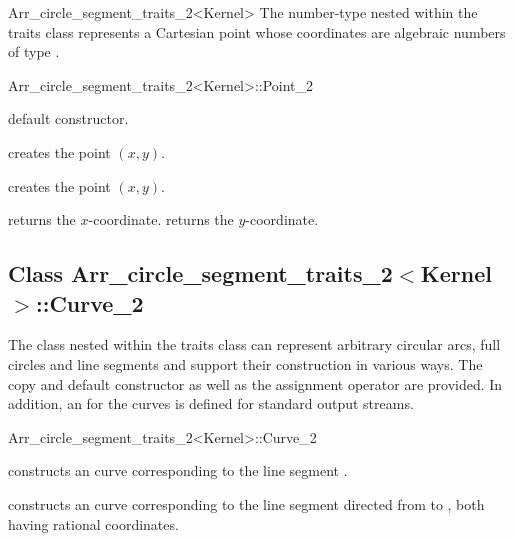 \begin{ccRefClass}{Arr_circle_segment_traits_2<Kernel>}
The  number-type nested within the traits class represents
a Cartesian point whose coordinates are algebraic numbers of type
.

\begin{ccClass}{Arr_circle_segment_traits_2<Kernel>::Point_2}

\ccTypes



\ccCreation
{}

    {default constructor.}

    {creates the point $(x,y)$.}

    {creates the point $(x,y)$.}

\ccAccessFunctions

  {returns the $x$-coordinate.}
\ccGlue
{}
  {returns the $y$-coordinate.}

\end{ccClass}

\subsection*{Class 
        Arr\_circle\_segment\_traits\_2$<$Kernel$>$::Curve\_2}

The  class nested within the traits class can represent
arbitrary circular arcs, full circles and line segments and support their
construction in various ways.
The copy and default constructor as well as the assignment operator are
provided. In addition, an  for the curves is defined for
standard output streams.

\begin{ccClass}{Arr_circle_segment_traits_2<Kernel>::Curve_2}

\ccCreation
{}

    {constructs an curve corresponding to the line segment .}

    {constructs an curve corresponding to the line segment directed
     from  to , both having rational coordinates.}


\end{ccClass}
\end{ccRefClass}
